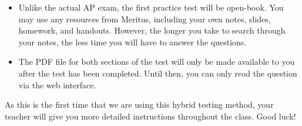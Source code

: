 \documentclass[letterpaper,11pt]{article}
\begin{document}
\begin{itemize}[itemsep=4pt,topsep=0pt,leftmargin=15pt]
\begin{itemize}
    \begin{center}
      \Large
      \href{https://ossfiles.ca/index.php/s/Gb32wnKwYfFZj5N}
           {https://ossfiles.ca/index.php/s/Gb32wnKwYfFZj5N}
    \end{center}
    For online classes, the booklet will also be sent to you via the Zoom chat
    window during class as well.

  \item Your teacher will give you instructions on how to scan and upload your
    work for the FRQs after the class ends.
  \end{itemize}
  
\item Unlike the actual AP exam, the first practice test will be open-book. You
  may use any resources from Meritus, including your own notes, slides,
  homework, and handouts. However, the longer you take to search through your
  notes, the less time you will have to answer the questions.

\item The PDF file for both sections of the test will only be made available to
  you after the test has been completed. Until then, you can only read the
  question via the web interface.
\end{itemize}
  
As this is the first time that we are using this hybrid testing method, your
teacher will give you more detailed instructions throughout the class. Good
luck!
\end{document}
